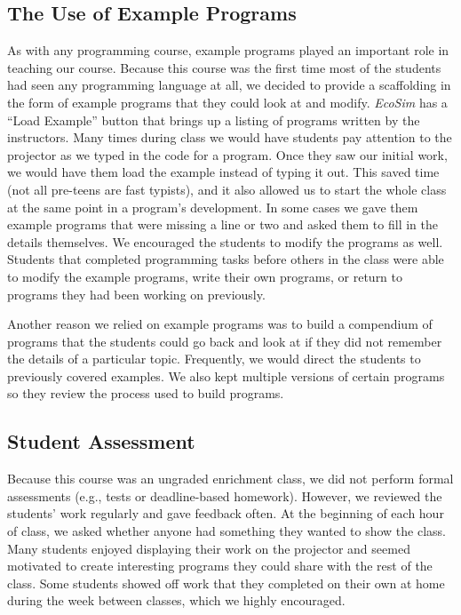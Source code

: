 \documentclass{sig-alternate}
\begin{document}
\vspace{0.7in}
\subsection{The Use of Example Programs}
As with any programming course, example programs played an important role in teaching our course.
Because this course was the first time most of the students had seen any programming language at all, we decided to provide a scaffolding in the form of example programs that they could look at and modify.  
\emph{EcoSim} has a ``Load Example'' button that brings up a listing of programs written by the instructors.  
Many times during class we would have students pay attention to the projector as we typed in the code for a program.
Once they saw our initial work, we would have them load the example instead of typing it out.  
This saved time (not all pre-teens are fast typists), and it also allowed us to start the whole class at the same point in a program's development.  
In some cases we gave them example programs that were missing a line or two and asked them to fill in the details themselves.  
We encouraged the students to modify the programs as well.
Students that completed programming tasks before others in the class were able to modify the example programs, write their own programs, or return to programs they had been working on previously.

Another reason we relied on example programs was to build a compendium of programs that the students
could go back and look at if they did not remember the details of a particular topic.  Frequently,
we would direct the students to previously covered examples.
We also kept multiple versions of certain programs so they review the process used to build programs.

\subsection{Student Assessment}
Because this course was an ungraded enrichment class, we did not perform formal assessments (e.g., tests or deadline-based homework). 
However, we reviewed the students' work regularly and gave feedback often.  
At the beginning of each hour of class, we asked whether anyone had something they wanted to show the class.  
Many students enjoyed displaying their work on the projector and seemed motivated to create interesting programs they could share with the rest of the class.  
Some students showed off work that they completed on their own at home during the week between classes, which we highly encouraged.
\end{document}
